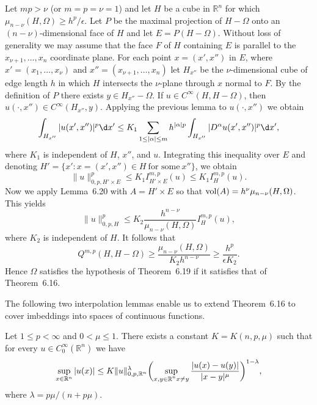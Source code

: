\begin{para}
  Let $mp>\nu$ (or $m=p=\nu=1$) and let $H$ be a cube in $\mathbb{R}^n$ for which
  $\mu_{n-\nu}(H,\Omega)\geq h^p/\epsilon$. Let $P$ be the maximal projection of
  $H-\Omega$ onto an $(n-\nu)$-dimensional face of $H$ and let $E=P(H-\Omega)$.
  Without loss of generality we may assume that the face $F$ of $H$ containing $E$
  is parallel to the $x_{\nu+1},\ldots,x_n$ coordinate plane. For each point
  $x=(x',x'')$ in $E$, where $x' = (x_1,\ldots,x_\nu)$ and $x'' = (x_{\nu+1},\ldots,x_n)$
  let $H_{x''}$ be the $\nu$-dimensional cube of edge length $h$ in which $H$
  intersects the $\nu$-plane through $x$ normal to $F$. By the definition of $P$
  there exists $y\in H_{x''}-\Omega$. If $u\in C^\infty(H,H-\Omega)$,
  then $u(\cdot,x'')\in C^\infty(H_{x''},y)$. Applying the previous lemma to $u(\cdot,x'')$
  we obtain
  \[ \int_{H_{x''}} |u(x',x'')|^p \d x' \leq K_1 \sum_{1\leq |\alpha|\leq m}
      h^{|\alpha|p} \int_{H_{x''}} |D^\alpha u(x',x'')|^p \d x', \]
  where $K_1$ is independent of $H$, $x''$, and $u$. Integrating this inequality
  over $E$ and denoting $H'=\{x':x=(x',x'')\in H\ \text{for some}\ x''\}$, we obtain
  \[\|u\|_{0,p,H'\times E}^p \leq K_1 I_{H'\times E}^{m,p}(u)
      \leq K_1 I_H^{m,p}(u).\]
  Now we apply Lemma~6.20 with $A=H'\times E$ so that $\operatorname{vol}(A) = h^\nu \mu_{n-\nu}(H,\Omega)$.
  This yields
  \[\|u\|_{0,p,H}^p \leq K_2 \frac{h^{n-\nu}}{\mu_{n-\nu}(H,\Omega)} I_H^{m,p}(u),\]
  where $K_2$ is independent of $H$. It follows that
  \[Q^{m,p}(H,H-\Omega) \geq \frac{\mu_{n-\nu}(H,\Omega)}{K_2 h^{n-\nu}}
    \geq \frac{h^p}{\epsilon K_2}.\]
  Hence $\Omega$ satisfies the hypothesis of Theorem~6.19 if it satisfies
  that of Theorem~6.16.
\end{para}

The following two interpolation lemmas enable us to extend Theorem~6.16
to cover imbeddings into spaces of continuous functions.

\begin{lemma}
  Let $1\leq p<\infty$ and $0<\mu\leq 1$. There exists a constant $K=K(n,p,\mu)$
  such that for every $u\in C_0^\infty(\mathbb{R}^n)$ we have
  \begin{equation}\label{eq:6.15}
    \sup_{x\in\mathbb{R}^n} |u(x)| \leq K \|u\|_{0,p,\mathbb{R}^n}^\lambda
      \biggl(\sup_{\substack{x,y\in\mathbb{R}^n}\\ x\neq y}
        \frac{|u(x)-u(y)|}{|x-y|^\mu}\biggr)^{1-\lambda},
  \end{equation}
  where $\lambda=p\mu/(n+p\mu)$.
\end{lemma}

